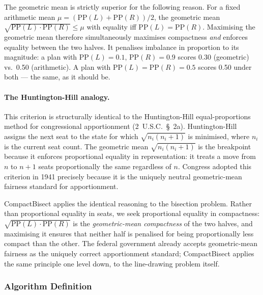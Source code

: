 The geometric mean is strictly superior for the following reason. For a fixed
arithmetic mean $\mu = (\mathrm{PP}(L) + \mathrm{PP}(R))/2$, the geometric
mean $\sqrt{\mathrm{PP}(L)\cdot\mathrm{PP}(R)} \leq \mu$ with equality iff
$\mathrm{PP}(L) = \mathrm{PP}(R)$. Maximising the geometric mean therefore
simultaneously maximises compactness \emph{and} enforces equality between the
two halves. It penalises imbalance in proportion to its magnitude: a plan
with $\mathrm{PP}(L) = 0.1$, $\mathrm{PP}(R) = 0.9$ scores 0.30 (geometric)
vs.\ 0.50 (arithmetic). A plan with $\mathrm{PP}(L) = \mathrm{PP}(R) = 0.5$
scores 0.50 under both --- the same, as it should be.

\paragraph{The Huntington-Hill analogy.}
This criterion is structurally identical to the Huntington-Hill equal-proportions
method for congressional apportionment (2~U.S.C.~\S~2a). Huntington-Hill
assigns the next seat to the state for which
$\sqrt{n_i(n_i+1)}$ is minimised, where $n_i$ is the current seat count. The
geometric mean $\sqrt{n_i(n_i+1)}$ is the breakpoint because it enforces
proportional equality in representation: it treats a move from $n$ to $n+1$
seats proportionally the same regardless of $n$. Congress adopted this
criterion in 1941 precisely because it is the uniquely neutral geometric-mean
fairness standard for apportionment.

CompactBisect applies the identical reasoning to the bisection problem.
Rather than proportional equality in seats, we seek proportional equality in
compactness: $\sqrt{\mathrm{PP}(L)\cdot\mathrm{PP}(R)}$ is the
\emph{geometric-mean compactness} of the two halves, and maximising it ensures
that neither half is penalised for being proportionally less compact than the
other. The federal government already accepts geometric-mean fairness as the
uniquely correct apportionment standard; CompactBisect applies the same
principle one level down, to the line-drawing problem itself.

\subsubsection{Algorithm Definition}

